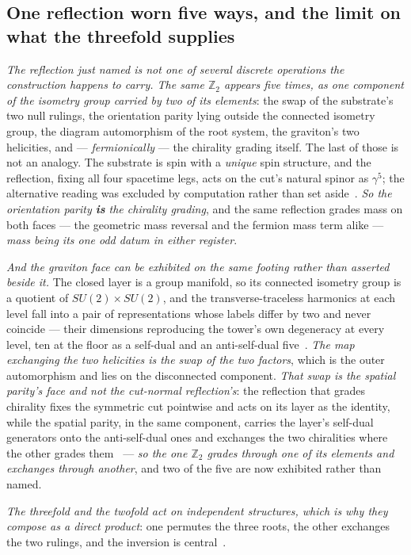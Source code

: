 \documentclass[11pt,a4paper]{article}
\theoremstyle{plain}
\theoremstyle{definition}
\begin{document}
\subsection{One reflection worn five ways, and the limit on what the threefold supplies}

\emph{The reflection just named is not one of several discrete operations the construction happens to
carry. The same $\mathbb{Z}_{2}$ appears five times, as one component of the isometry group carried by two of
its elements}: the swap of the substrate's two
null rulings, the orientation parity lying outside the connected isometry group, the diagram automorphism of
the root system, the graviton's two helicities, and --- \emph{fermionically} --- the chirality grading
itself. The last of those is not an analogy. The substrate is spin with a \emph{unique} spin structure, and
the reflection, fixing all four spacetime legs, acts on the cut's natural spinor as $\gamma^{5}$; the
alternative reading was excluded by computation rather than set aside~\cite{JanzenAlgebroid}. \emph{So the
orientation parity \textbf{is} the chirality grading}, and the same reflection grades mass on both faces ---
the geometric mass reversal and the fermion mass term alike --- \emph{mass being its one odd datum in either
register}.

\emph{And the graviton face can be exhibited on the same footing rather than asserted beside it.} The closed
layer is a group manifold, so its connected isometry group is a quotient of $SU(2)\times SU(2)$, and the
transverse-traceless harmonics at each level fall into a pair of representations whose labels differ by two
and never coincide --- their dimensions reproducing the tower's own degeneracy at every level, ten at the
floor as a self-dual and an anti-self-dual five~\cite{JanzenCanonicalTime}. \emph{The map exchanging the two
helicities is the swap of the two factors}, which is the outer automorphism and lies on the disconnected
component. \emph{That swap is the spatial parity's face and not the cut-normal reflection's}: the reflection
that grades chirality fixes the symmetric cut pointwise and acts on its layer as the identity, while the spatial
parity, in the same component, carries the layer's self-dual generators onto the anti-self-dual ones and exchanges
the two chiralities where the other grades them~\cite{JanzenMatter} --- \emph{so the one $\mathbb{Z}_2$ grades
through one of its elements and exchanges through another}, and two of the five are now exhibited rather than
named.

\emph{The threefold and the twofold act on independent structures, which is why they compose as a direct
product}: one permutes the three roots, the other exchanges the two rulings, and the inversion is
central~\cite{JanzenAlgebroid}.
\end{document}
